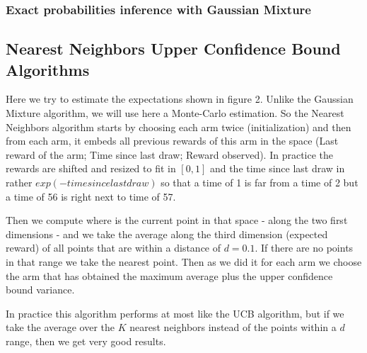 \documentclass[french]{beamer}
\begin{document}
\begin{frame}
	\frametitle{Exact probabilities inference with Gaussian Mixture}
	
	\subsection{Nearest Neighbors Upper Confidence Bound Algorithms}
	
	Here we try to estimate the expectations shown in figure 2. Unlike the Gaussian Mixture algorithm, we will use here a Monte-Carlo estimation. So the Nearest Neighbors algorithm starts by choosing each arm twice (initialization) and then from each arm, it embeds all previous rewards of this arm in the space (Last reward of the arm; Time since last draw; Reward observed). In practice the rewards are shifted and resized to fit in $[0,1]$ and the time since last draw in rather $exp(-time since last draw)$ so that a time of 1 is far from a time of 2 but a time of 56 is right next to time of 57.
	
	Then we compute where is the current point in that space - along the two first dimensions - and we take the average along the third dimension (expected reward) of all points that are within a distance of $d=0.1$. If there are no points in that range we take the nearest point. Then as we did it for each arm we choose the arm that has obtained the maximum average plus the upper confidence bound variance.
	
	In practice this algorithm performs at most like the UCB algorithm, but if we take the average over the $K$ nearest neighbors instead of the points within a $d$ range, then we get very good results.
\end{frame}
\end{document}
